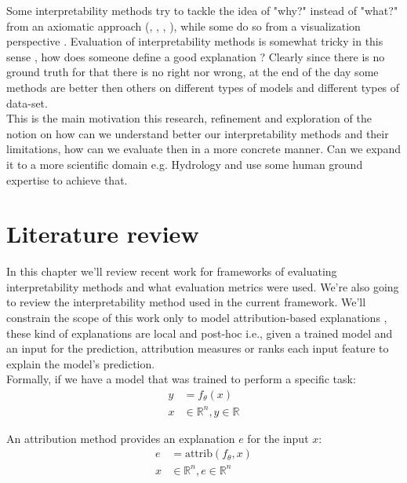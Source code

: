 \documentclass[12pt]{report}
\begin{document}
Some interpretability methods try to tackle the idea of "why?" instead of "what?" from an axiomatic approach 
(\cite{DBLP:journals/corr/SundararajanTY17}, \cite{DBLP:journals/corr/abs-2111-07668}, \cite{DBLP:journals/corr/MontavonSM17}, \cite{https://doi.org/10.48550/arxiv.1711.00867}),  while some do so
from a visualization perspective \cite{DBLP:journals/corr/abs-1802-00614}. Evaluation of interpretability methods is somewhat tricky in this sense , how does someone define a good explanation ? Clearly since there is no ground truth for that there is no right nor wrong, at the end of the day some methods are better then others on different types of models and different types of data-set. \\ 

This is the main motivation this research,  refinement and exploration of the notion on how can we understand better our interpretability methods and their limitations, how can we evaluate then in a more concrete manner. Can we expand it to a more scientific domain e.g. Hydrology and use some human ground expertise to achieve that. 


\newpage

\chapter{Literature review} 

In this chapter we'll review recent work for frameworks of evaluating interpretability methods and what evaluation metrics were used. We're also going to review the interpretability method used in the current framework. We'll constrain the scope of this work only to model attribution-based explanations \cite{electronics10050593}, these kind of explanations are local and post-hoc i.e., given a trained model and an input for the prediction, attribution measures or ranks each input feature to explain the model's prediction. \\

Formally, if we have a model that was trained to perform a specific task:
\begin{align*}
	y & = f_{\theta}(x) \\
	x & \in \mathbb{R}^n, y \in \mathbb{R}
\end{align*}

An attribution method provides an explanation $e$ for the input $x$:
\begin{align*}
	e &= \text{attrib}(f_{\theta}, x) \\
	x & \in \mathbb{R}^n, e \in \mathbb{R}^n
\end{align*}
\end{document}
